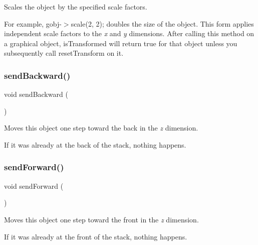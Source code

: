 Scales the object by the specified scale factors. 

For example, {\ttfamily gobj-\/$>$scale(2, 2);} doubles the size of the object. This form applies independent scale factors to the {\itshape x} and {\itshape y} dimensions. After calling this method on a graphical object, {\ttfamily is\+Transformed} will return {\ttfamily true} for that object unless you subsequently call {\ttfamily reset\+Transform} on it. \mbox{\label{classsgl_1_1GObject_ab6747f40313c531c2db32edb5b63b9b7}} 
\subsubsection{\texorpdfstring{send\+Backward()}{sendBackward()}}
{\footnotesize\ttfamily void send\+Backward (\begin{DoxyParamCaption}{ }\end{DoxyParamCaption})\hspace{0.3cm}{\ttfamily [inherited]}}



Moves this object one step toward the back in the {\itshape z} dimension. 

If it was already at the back of the stack, nothing happens. \mbox{\label{classsgl_1_1GObject_a710b3e449c9facba7847c91ab170d281}} 
\subsubsection{\texorpdfstring{send\+Forward()}{sendForward()}}
{\footnotesize\ttfamily void send\+Forward (\begin{DoxyParamCaption}{ }\end{DoxyParamCaption})\hspace{0.3cm}{\ttfamily [inherited]}}



Moves this object one step toward the front in the {\itshape z} dimension. 

If it was already at the front of the stack, nothing happens. \mbox{\label{classsgl_1_1GObject_a0f7f1efbb7fd46dde2867c4ad0330896}} 
